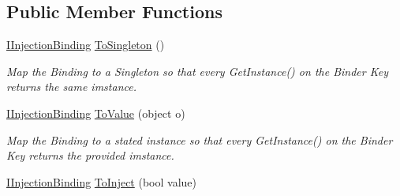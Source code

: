 \subsection*{Public Member Functions}
\begin{DoxyCompactItemize}
\item 
\hypertarget{interfacestrange_1_1extensions_1_1injector_1_1api_1_1_i_injection_binding_ae88e872043b9c0c8e6932d6457f8c5e7}{\hyperlink{interfacestrange_1_1extensions_1_1injector_1_1api_1_1_i_injection_binding}{I\-Injection\-Binding} \hyperlink{interfacestrange_1_1extensions_1_1injector_1_1api_1_1_i_injection_binding_ae88e872043b9c0c8e6932d6457f8c5e7}{To\-Singleton} ()}\label{interfacestrange_1_1extensions_1_1injector_1_1api_1_1_i_injection_binding_ae88e872043b9c0c8e6932d6457f8c5e7}

\begin{DoxyCompactList}\small\item\em Map the Binding to a Singleton so that every {\ttfamily Get\-Instance()} on the Binder Key returns the same imstance. \end{DoxyCompactList}\item 
\hypertarget{interfacestrange_1_1extensions_1_1injector_1_1api_1_1_i_injection_binding_a7e7eee027ed73a36c38f18b865bbe4c6}{\hyperlink{interfacestrange_1_1extensions_1_1injector_1_1api_1_1_i_injection_binding}{I\-Injection\-Binding} \hyperlink{interfacestrange_1_1extensions_1_1injector_1_1api_1_1_i_injection_binding_a7e7eee027ed73a36c38f18b865bbe4c6}{To\-Value} (object o)}\label{interfacestrange_1_1extensions_1_1injector_1_1api_1_1_i_injection_binding_a7e7eee027ed73a36c38f18b865bbe4c6}

\begin{DoxyCompactList}\small\item\em Map the Binding to a stated instance so that every {\ttfamily Get\-Instance()} on the Binder Key returns the provided imstance. \end{DoxyCompactList}\item 
\hypertarget{interfacestrange_1_1extensions_1_1injector_1_1api_1_1_i_injection_binding_a372558a435574953af1cb6118306117d}{\hyperlink{interfacestrange_1_1extensions_1_1injector_1_1api_1_1_i_injection_binding}{I\-Injection\-Binding} \hyperlink{interfacestrange_1_1extensions_1_1injector_1_1api_1_1_i_injection_binding_a372558a435574953af1cb6118306117d}{To\-Inject} (bool value)}\label{interfacestrange_1_1extensions_1_1injector_1_1api_1_1_i_injection_binding_a372558a435574953af1cb6118306117d}


\end{DoxyCompactItemize}
